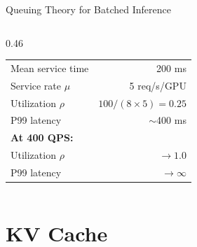 \documentclass[aspectratio=169, 12pt]{beamer}
\begin{document}
\begin{frame}{Queuing Theory for Batched Inference}
\begin{columns}[T]
\begin{column}{0.46\textwidth}
    \vspace{0.1cm}
    {\scriptsize
    \renewcommand{\arraystretch}{1.1}
    \begin{tabular}{@{}lr@{}}
      \toprule
      Mean service time & 200 ms \\
      Service rate $\mu$ & 5 req/s/GPU \\
      Utilization $\rho$ & $100/(8 \times 5) = 0.25$ \\
      P99 latency & $\sim$400 ms \\
      \midrule
      \textbf{At 400 QPS:} & \\
      Utilization $\rho$ & $\to 1.0$ \\
      P99 latency & $\to \infty$ \\
      \bottomrule
    \end{tabular}
    }
  \end{column}
\end{columns}

\end{frame}

\section{KV Cache}

\end{document}
